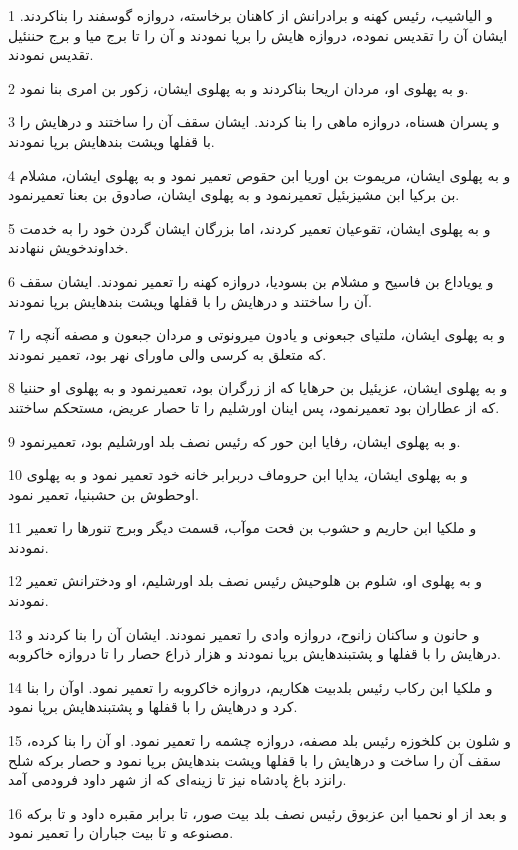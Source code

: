 \par 1 و الیاشیب، رئیس کهنه و برادرانش از کاهنان برخاسته، دروازه گوسفند را بناکردند. ایشان آن را تقدیس نموده، دروازه هایش را برپا نمودند و آن را تا برج میا و برج حننئیل تقدیس نمودند.
\par 2 و به پهلوی او، مردان اریحا بناکردند و به پهلوی ایشان، زکور بن امری بنا نمود.
\par 3 و پسران هسناه، دروازه ماهی را بنا کردند. ایشان سقف آن را ساختند و درهایش را با قفلها وپشت بندهایش برپا نمودند.
\par 4 و به پهلوی ایشان، مریموت بن اوریا ابن حقوص تعمیر نمود و به پهلوی ایشان، مشلام بن برکیا ابن مشیزبئیل تعمیرنمود و به پهلوی ایشان، صادوق بن بعنا تعمیرنمود.
\par 5 و به پهلوی ایشان، تقوعیان تعمیر کردند، اما بزرگان ایشان گردن خود را به خدمت خداوندخویش ننهادند.
\par 6 و یویاداع بن فاسیح و مشلام بن بسودیا، دروازه کهنه را تعمیر نمودند. ایشان سقف آن را ساختند و درهایش را با قفلها وپشت بندهایش برپا نمودند.
\par 7 و به پهلوی ایشان، ملتیای جبعونی و یادون میرونوتی و مردان جبعون و مصفه آنچه را که متعلق به کرسی والی ماورای نهر بود، تعمیر نمودند.
\par 8 و به پهلوی ایشان، عزیئیل بن حرهایا که از زرگران بود، تعمیرنمود و به پهلوی او حننیا که از عطاران بود تعمیرنمود، پس اینان اورشلیم را تا حصار عریض، مستحکم ساختند.
\par 9 و به پهلوی ایشان، رفایا ابن حور که رئیس نصف بلد اورشلیم بود، تعمیرنمود.
\par 10 و به پهلوی ایشان، یدایا ابن حروماف دربرابر خانه خود تعمیر نمود و به پهلوی اوحطوش بن حشبنیا، تعمیر نمود.
\par 11 و ملکیا ابن حاریم و حشوب بن فحت موآب، قسمت دیگر وبرج تنورها را تعمیر نمودند.
\par 12 و به پهلوی او، شلوم بن هلوحیش رئیس نصف بلد اورشلیم، او ودخترانش تعمیر نمودند.
\par 13 و حانون و ساکنان زانوح، دروازه وادی را تعمیر نمودند. ایشان آن را بنا کردند و درهایش را با قفلها و پشتبندهایش برپا نمودند و هزار ذراع حصار را تا دروازه خاکروبه.
\par 14 و ملکیا ابن رکاب رئیس بلدبیت هکاریم، دروازه خاکروبه را تعمیر نمود. اوآن را بنا کرد و درهایش را با قفلها و پشتبندهایش برپا نمود.
\par 15 و شلون بن کلخوزه رئیس بلد مصفه، دروازه چشمه را تعمیر نمود. او آن را بنا کرده، سقف آن را ساخت و درهایش را با قفلها وپشت بندهایش برپا نمود و حصار برکه شلح رانزد باغ پادشاه نیز تا زینه‌ای که از شهر داود فرودمی آمد.
\par 16 و بعد از او نحمیا ابن عزبوق رئیس نصف بلد بیت صور، تا برابر مقبره داود و تا برکه مصنوعه و تا بیت جباران را تعمیر نمود.
